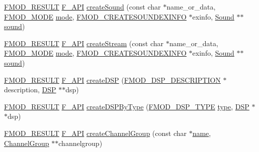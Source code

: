 \begin{DoxyCompactItemize}
\item 
\hyperlink{fmod_8h_ae6ddadf8cb315e93ae7e6456b19db276}{F\-M\-O\-D\-\_\-\-R\-E\-S\-U\-L\-T} \hyperlink{fmod_8h_ace803d13e798b0cdde4384f9f323b901}{F\-\_\-\-A\-P\-I} \hyperlink{class_f_m_o_d_1_1_system_aca0782c1d367a54ddf00aea484971735}{create\-Sound} (const char $\ast$name\-\_\-or\-\_\-data, \hyperlink{fmod_8h_ab817628375dd23c707108f7d9fd302ca}{F\-M\-O\-D\-\_\-\-M\-O\-D\-E} \hyperlink{glew_8h_a1e71d9c196e4683cc06c4b54d53f7ef5}{mode}, \hyperlink{struct_f_m_o_d___c_r_e_a_t_e_s_o_u_n_d_e_x_i_n_f_o}{F\-M\-O\-D\-\_\-\-C\-R\-E\-A\-T\-E\-S\-O\-U\-N\-D\-E\-X\-I\-N\-F\-O} $\ast$exinfo, \hyperlink{class_f_m_o_d_1_1_sound}{Sound} $\ast$$\ast$\hyperlink{fmod__codec_8h_a1a31a11c995834bd0034c804d3f01098}{sound})
\item 
\hyperlink{fmod_8h_ae6ddadf8cb315e93ae7e6456b19db276}{F\-M\-O\-D\-\_\-\-R\-E\-S\-U\-L\-T} \hyperlink{fmod_8h_ace803d13e798b0cdde4384f9f323b901}{F\-\_\-\-A\-P\-I} \hyperlink{class_f_m_o_d_1_1_system_accec6ee2c51fccf5091098658b65491c}{create\-Stream} (const char $\ast$name\-\_\-or\-\_\-data, \hyperlink{fmod_8h_ab817628375dd23c707108f7d9fd302ca}{F\-M\-O\-D\-\_\-\-M\-O\-D\-E} \hyperlink{glew_8h_a1e71d9c196e4683cc06c4b54d53f7ef5}{mode}, \hyperlink{struct_f_m_o_d___c_r_e_a_t_e_s_o_u_n_d_e_x_i_n_f_o}{F\-M\-O\-D\-\_\-\-C\-R\-E\-A\-T\-E\-S\-O\-U\-N\-D\-E\-X\-I\-N\-F\-O} $\ast$exinfo, \hyperlink{class_f_m_o_d_1_1_sound}{Sound} $\ast$$\ast$\hyperlink{fmod__codec_8h_a1a31a11c995834bd0034c804d3f01098}{sound})
\item 
\hyperlink{fmod_8h_ae6ddadf8cb315e93ae7e6456b19db276}{F\-M\-O\-D\-\_\-\-R\-E\-S\-U\-L\-T} \hyperlink{fmod_8h_ace803d13e798b0cdde4384f9f323b901}{F\-\_\-\-A\-P\-I} \hyperlink{class_f_m_o_d_1_1_system_a9e14998873b05d52108096d92b7994bd}{create\-D\-S\-P} (\hyperlink{struct_f_m_o_d___d_s_p___d_e_s_c_r_i_p_t_i_o_n}{F\-M\-O\-D\-\_\-\-D\-S\-P\-\_\-\-D\-E\-S\-C\-R\-I\-P\-T\-I\-O\-N} $\ast$description, \hyperlink{class_f_m_o_d_1_1_d_s_p}{D\-S\-P} $\ast$$\ast$dsp)
\item 
\hyperlink{fmod_8h_ae6ddadf8cb315e93ae7e6456b19db276}{F\-M\-O\-D\-\_\-\-R\-E\-S\-U\-L\-T} \hyperlink{fmod_8h_ace803d13e798b0cdde4384f9f323b901}{F\-\_\-\-A\-P\-I} \hyperlink{class_f_m_o_d_1_1_system_ab3a4c98eb70da7e96866b0f40f5cbd22}{create\-D\-S\-P\-By\-Type} (\hyperlink{fmod__dsp_8h_a3bffdef0fa956bf454fa078bfdfab3ae}{F\-M\-O\-D\-\_\-\-D\-S\-P\-\_\-\-T\-Y\-P\-E} \hyperlink{fmod_8h_a5338b9cb3874378d7e5adfbe80a8a381}{type}, \hyperlink{class_f_m_o_d_1_1_d_s_p}{D\-S\-P} $\ast$$\ast$dsp)
\item 
\hyperlink{fmod_8h_ae6ddadf8cb315e93ae7e6456b19db276}{F\-M\-O\-D\-\_\-\-R\-E\-S\-U\-L\-T} \hyperlink{fmod_8h_ace803d13e798b0cdde4384f9f323b901}{F\-\_\-\-A\-P\-I} \hyperlink{class_f_m_o_d_1_1_system_af4d7063579a60c8986eb8bb1f67e7f2c}{create\-Channel\-Group} (const char $\ast$\hyperlink{fmod__codec_8h_a5c4947d4516dd7cfa3505ce3a648a4ef}{name}, \hyperlink{class_f_m_o_d_1_1_channel_group}{Channel\-Group} $\ast$$\ast$channelgroup)
$$
\end{DoxyCompactItemize}
